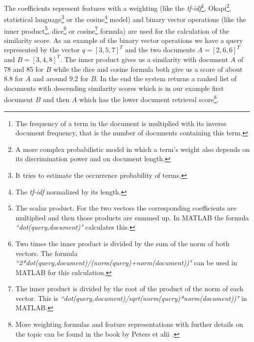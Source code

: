 \documentclass[journal]{IEEEtran}
\begin{document}
The coefficients represent features with a weighting (like the \textit{tf-idf}\footnote{The frequency of a term in the document is multiplied with its inverse document frequency, that is the number of documents containing this term.}, Okapi\footnote{A more complex probabilistic model in which a term's weight also depends on its discrimination power and on document length.}, statistical language\footnote{It tries to estimate the occurrence probability of terms.} or the cosine\footnote{The \textit{tf-idf} normalized by its length.} model) and binary vector operations (like the inner product\footnote{The scalar product. For the two vectors the corresponding coefficients are multiplied and then those products are summed up. In MATLAB the formula \textit{``dot(query,document)"} calculates this.}, dice\footnote{Two times the inner product is divided by the sum of the norm of both vectors. The formula \textit{``2*dot(query,document)/(norm(query)+norm(document))"} can be used in MATLAB for this calculation.} or cosine\footnote{The inner product is divided by the root of the product of the norm of each vector. This is \textit{``dot(query,document)/sqrt(norm(query)*norm(document))"} in MATLAB.} formula) are used for the calculation of the similarity score.
As an example of the binary vector operations we have a query represented by the vector $q = [3, 5, 7]^T$ and the two documents $A = [2, 6, 6]^T$ and $B = [3, 4, 8]^T$.
The inner product gives us a similarity with document $A$ of 78 and 85 for $B$ while the dice and cosine formula both give us a score of about 8.8 for $A$ and around 9.2 for $B$.
In the end the system returns a ranked list of documents with descending similarity scores which is in our example first document $B$ and then $A$ which has the lower document retrieval score\footnote{More weighting formulas and feature representations with further details on the topic can be found in the book by Peters et alii \cite{peters12}.}.
\end{document}
